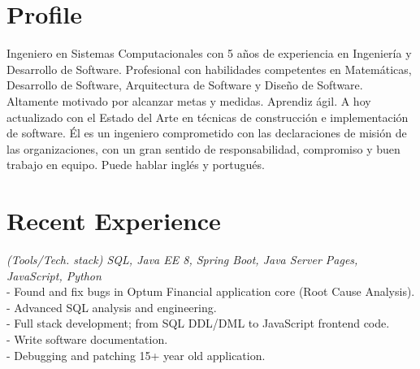 \documentclass[]{CV-JuanCamiloFlorez}
\begin{document}
\begin{minipage}[t]{0.66\textwidth} 


\section{Profile}
Ingeniero en Sistemas Computacionales con 5 años de experiencia en Ingeniería y Desarrollo de Software. Profesional con habilidades competentes en Matemáticas, Desarrollo de Software, Arquitectura de Software y Diseño de Software. Altamente motivado por alcanzar metas y medidas. Aprendiz ágil. A hoy actualizado con el Estado del Arte en técnicas de construcción e implementación de software. Él es un ingeniero comprometido con las declaraciones de misión de las organizaciones, con un gran sentido de responsabilidad, compromiso y buen trabajo en equipo. Puede hablar inglés y portugués.


\sectionsep

\section{Recent Experience}
    \textit{(Tools/Tech. stack) SQL, Java EE 8, Spring Boot, Java Server Pages, JavaScript, Python} \\
        - Found and fix bugs in Optum Financial application core (Root Cause Analysis). \\
        - Advanced SQL analysis and engineering. \\
        - Full stack development; from SQL DDL/DML to JavaScript frontend code. \\
        - Write software documentation. \\
        - Debugging and patching 15+ year old application. \\
        \sectionsep


\end{minipage}
\end{document}
